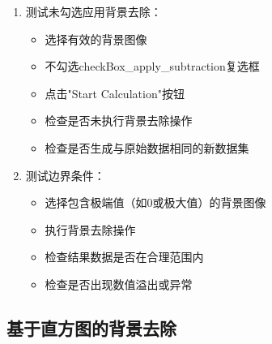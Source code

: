 \documentclass[a4paper,12pt]{report}	%
\begin{document}
\begin{enumerate}
    \item 测试未勾选应用背景去除：
    \begin{itemize}
        \item 选择有效的背景图像
        \item 不勾选checkBox\_apply\_subtraction复选框
        \item 点击"Start Calculation"按钮
        \item 检查是否未执行背景去除操作
        \item 检查是否生成与原始数据相同的新数据集
    \end{itemize}

    \item 测试边界条件：
    \begin{itemize}
        \item 选择包含极端值（如0或极大值）的背景图像
        \item 执行背景去除操作
        \item 检查结果数据是否在合理范围内
        \item 检查是否出现数值溢出或异常
    \end{itemize}
\end{enumerate}


\subsection{基于直方图的背景去除}
\end{document}
